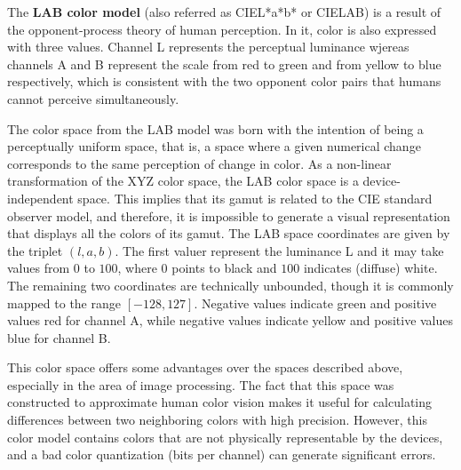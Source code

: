 The \textbf{LAB color model} (also referred as CIEL*a*b* or CIELAB) is a result of the opponent-process theory of human perception. In it, color is also expressed with three values. Channel L represents the perceptual luminance wjereas channels A and B represent the scale from red to green and from yellow to blue respectively, which is consistent with the two opponent color pairs that humans cannot perceive simultaneously. 

The color space from the LAB model was born with the intention of being a perceptually uniform space, that is, a space where a given numerical change corresponds to the same perception of change in color. As a non-linear transformation of the XYZ color space, the LAB color space is a device-independent space. This implies that its gamut is related to the CIE standard observer model, and therefore, it is impossible to generate a visual representation that displays all the colors of its gamut. The LAB space coordinates are given by the triplet $(l,a,b)$. The first valuer represent the luminance L and it may take values from $0$ to $100$, where 0 points to black and $100$ indicates (diffuse) white. The remaining two coordinates are technically unbounded, though it is commonly mapped to the range $[-128, 127]$. Negative values indicate green and positive values red for channel A, while negative values indicate yellow and positive values blue for channel B. 

This color space offers some advantages over the spaces described above, especially in the area of image processing. The fact that this space was constructed to approximate human color vision makes it useful for calculating differences between two neighboring colors with high precision. However, this color model contains colors that are not physically representable by the devices, and a bad color quantization (bits per channel) can generate significant errors.

